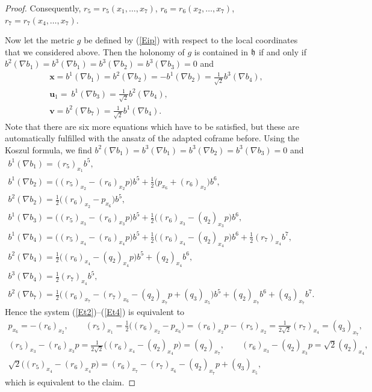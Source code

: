 \documentclass[pdftex]{sigma}
\numberwithin{equation}{section}
\newcommand\fh{{\frak h}}
\newcommand\bx{{\mathbf x}}
\newcommand\bu{{\mathbf u}}
\newcommand\bv{{\mathbf v}}
\begin{document}
\begin{proof}
Consequently, $r_5=r_5(x_1,\dots,x_7)$, $r_6=r_6(x_2,\dots,x_7)$, $r_7=r_7(x_4,\dots,x_7)$.

Now let the metric $g$ be defined by (\ref{Eip}) with respect to the local coordinates that we considered above. Then the holonomy of $g$ is contained in $\fh$ if and only if $b^2(\nabla b_{1})=b^3(\nabla b_{1})=b^3(\nabla b_{2})=b^3(\nabla b_{3})=0$ and
\begin{gather}
\bx=b^1(\nabla b_1)=b^2(\nabla b_2)=-b^1(\nabla b_2)= \tfrac1{\sqrt2} b^3(\nabla b_4), \label{Et2}\\
\bu_1=\ b^1(\nabla b_3)= \tfrac 1{\sqrt2}b^2(\nabla b_4), \\
\bv= b^2(\nabla b_7)= \tfrac 1{\sqrt2}b^1(\nabla b_4). \label{Et4}
\end{gather}
Note that there are six more equations which have to be satisfied, but these are automatically fulfilled with the ansatz of the adapted coframe before. Using the Koszul formula, we find $b^2(\nabla b_{1})=b^3(\nabla b_{1})=b^3(\nabla b_{2})=b^3(\nabla b_{3})=0$ and
\begin{gather*}
b^1(\nabla b_1) = (r_5)_{x_1} b^5, \\
b^1(\nabla b_2) = \big((r_5)_{x_2} -(r_6)_{x_2}p\big)b^5 + \tfrac12 \big(p_{x_6}+(r_6)_{x_2}\big) b^6, \\
b^{2}(\nabla b_{2})= \tfrac12\big((r_6)_{x_2}- p_{x_6}\big) b^5, \\
b^1(\nabla b_3)= \big((r_5)_{x_3} -(r_6)_{x_3}p\big)b^5 +\tfrac12\big((r_6)_{x_3}- (q_2)_{x_3}p\big) b^6 , \\
b^1(\nabla b_4) = \big( (r_5)_{x_4}-(r_6)_{x_4} p\big)b^5 +\tfrac12\big((r_6)_{x_4}-(q_2)_{x_4} p\big) b^6 +\frac12 (r_7)_{x_4}b^7 , \\
b^2(\nabla b_4) = \tfrac12\big((r_6)_{x_4}-(q_2)_{x_4}p\big) b^5 +(q_2)_{x_4}b^6 , \\
b^3(\nabla b_4) = \tfrac12 (r_7)_{x_4}b^5 , \\
b^2(\nabla b_7)= \tfrac12 \big((r_6)_{x_7}-(r_7)_{x_6} -(q_2)_{x_7} p+(q_3)_{x_5}\big)b^5 +(q_2)_{x_7}b^6+(q_3)_{x_7}b^7.
\end{gather*}
Hence the system (\ref{Et2})--(\ref{Et4}) is equivalent to
\begin{gather*}
 p_{x_6}=-(r_6)_{x_2},\qquad
(r_5)_{x_1} =\tfrac12\big((r_6)_{x_2}- p_{x_6}\big) =(r_6)_{x_2}p-(r_5)_{x_2}=\tfrac 1{2\sqrt2}(r_7)_{x_4}=(q_3)_{x_7},\\
(r_5)_{x_3} -(r_6)_{x_3}p= \tfrac1{2\sqrt 2}\big((r_6)_{x_4}-(q_2)_{x_4}p\big)=(q_2)_{x_7},\qquad
 (r_6)_{x_3}- (q_2)_{x_3}p= {\sqrt2}(q_2)_{x_4},\\
\sqrt2 \big( (r_5)_{x_4}-(r_6)_{x_4} p\big)=(r_6)_{x_7}-(r_7)_{x_6} -(q_2)_{x_7} p+(q_3)_{x_5},
\end{gather*}
which is equivalent to the claim. \end{proof}
\end{document}
